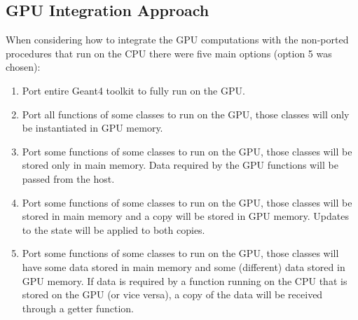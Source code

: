 \documentclass[12pt]{article}
\begin{document}
\subsection{GPU Integration Approach} %
When considering how to integrate the GPU computations with the non-ported procedures that run on the CPU there were five main options (option 5 was chosen):
\begin{enumerate}
\item Port entire Geant4 toolkit to fully run on the GPU.
\item Port all functions of some classes to run on the GPU, those classes will only be instantiated in GPU memory.
\item Port some functions of some classes to run on the GPU, those classes will be stored only in main memory. Data required by the GPU functions will be passed from the host.
\item Port some functions of some classes to run on the GPU, those classes will be stored in main memory and a copy will be stored in GPU memory. Updates to the state will be applied to both copies.
\item Port some functions of some classes to run on the GPU, those classes will have some data stored in main memory and some (different) data stored in GPU memory. If data is required by a function running on the CPU that is stored on the GPU (or vice versa), a copy of the data will be received through a getter function.
\end{enumerate}
\end{document}
